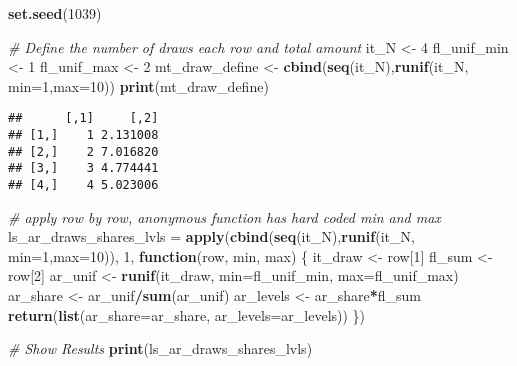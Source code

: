 \documentclass[
]{book}
\newenvironment{Shaded}{\begin{snugshade}}{\end{snugshade}}
\newcommand{\CommentTok}[1]{\textcolor[rgb]{0.56,0.35,0.01}{\textit{#1}}}
\newcommand{\ControlFlowTok}[1]{\textcolor[rgb]{0.13,0.29,0.53}{\textbf{#1}}}
\newcommand{\DataTypeTok}[1]{\textcolor[rgb]{0.13,0.29,0.53}{#1}}
\newcommand{\DecValTok}[1]{\textcolor[rgb]{0.00,0.00,0.81}{#1}}
\newcommand{\KeywordTok}[1]{\textcolor[rgb]{0.13,0.29,0.53}{\textbf{#1}}}
\newcommand{\NormalTok}[1]{#1}
\newcommand{\OperatorTok}[1]{\textcolor[rgb]{0.81,0.36,0.00}{\textbf{#1}}}
\newcommand{\StringTok}[1]{\textcolor[rgb]{0.31,0.60,0.02}{#1}}
\begin{document}
\begin{Shaded}
\begin{Highlighting}[]
\KeywordTok{set.seed}\NormalTok{(}\DecValTok{1039}\NormalTok{)}

\CommentTok{# Define the number of draws each row and total amount}
\NormalTok{it_N <-}\StringTok{ }\DecValTok{4}
\NormalTok{fl_unif_min <-}\StringTok{ }\DecValTok{1}
\NormalTok{fl_unif_max <-}\StringTok{ }\DecValTok{2}
\NormalTok{mt_draw_define <-}\StringTok{ }\KeywordTok{cbind}\NormalTok{(}\KeywordTok{seq}\NormalTok{(it_N),}\KeywordTok{runif}\NormalTok{(it_N, }\DataTypeTok{min=}\DecValTok{1}\NormalTok{,}\DataTypeTok{max=}\DecValTok{10}\NormalTok{))}
\KeywordTok{print}\NormalTok{(mt_draw_define)}
\end{Highlighting}
\end{Shaded}

\begin{verbatim}
##      [,1]     [,2]
## [1,]    1 2.131008
## [2,]    2 7.016820
## [3,]    3 4.774441
## [4,]    4 5.023006
\end{verbatim}

\begin{Shaded}
\begin{Highlighting}[]
\CommentTok{# apply row by row, anonymous function has hard coded min and max}
\NormalTok{ls_ar_draws_shares_lvls =}\StringTok{ }\KeywordTok{apply}\NormalTok{(}\KeywordTok{cbind}\NormalTok{(}\KeywordTok{seq}\NormalTok{(it_N),}\KeywordTok{runif}\NormalTok{(it_N, }\DataTypeTok{min=}\DecValTok{1}\NormalTok{,}\DataTypeTok{max=}\DecValTok{10}\NormalTok{)),}
                                \DecValTok{1}\NormalTok{,}
                                \ControlFlowTok{function}\NormalTok{(row, min, max) \{}
\NormalTok{                                 it_draw <-}\StringTok{ }\NormalTok{row[}\DecValTok{1}\NormalTok{]}
\NormalTok{                                 fl_sum <-}\StringTok{ }\NormalTok{row[}\DecValTok{2}\NormalTok{]}
\NormalTok{                                 ar_unif <-}\StringTok{ }\KeywordTok{runif}\NormalTok{(it_draw,}
                                                  \DataTypeTok{min=}\NormalTok{fl_unif_min,}
                                                  \DataTypeTok{max=}\NormalTok{fl_unif_max)}
\NormalTok{                                 ar_share <-}\StringTok{ }\NormalTok{ar_unif}\OperatorTok{/}\KeywordTok{sum}\NormalTok{(ar_unif)}
\NormalTok{                                 ar_levels <-}\StringTok{ }\NormalTok{ar_share}\OperatorTok{*}\NormalTok{fl_sum}
                                 \KeywordTok{return}\NormalTok{(}\KeywordTok{list}\NormalTok{(}\DataTypeTok{ar_share=}\NormalTok{ar_share,}
                                             \DataTypeTok{ar_levels=}\NormalTok{ar_levels))}
\NormalTok{                                \})}

\CommentTok{# Show Results}
\KeywordTok{print}\NormalTok{(ls_ar_draws_shares_lvls)}
\end{Highlighting}
\end{Shaded}
\end{document}
